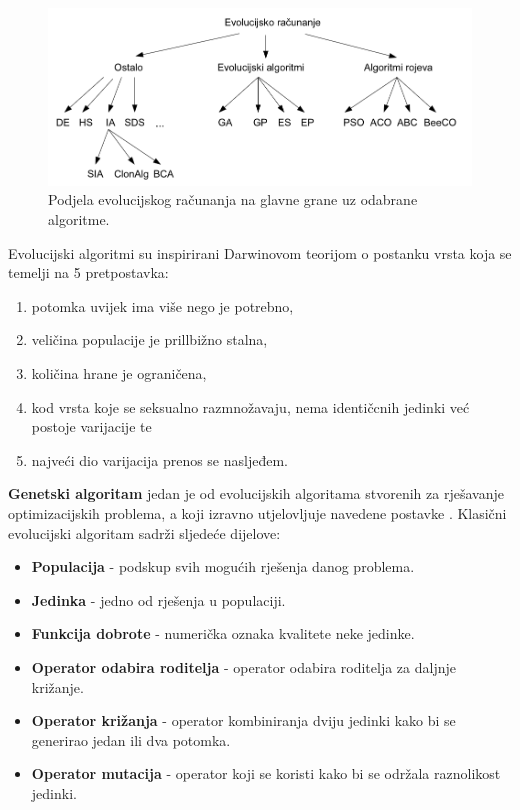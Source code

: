 \documentclass[times, utf8, zavrsni]{fer}
\begin{document}
\begin{figure}[htb]
\centering
\includegraphics[width=15cm]{images/evolucijske_grane.png}
\caption{Podjela evolucijskog računanja na glavne grane uz odabrane algoritme. \citep{cupic-disertacija}}
\label{fig:evolucijske_grane}
\end{figure}

Evolucijski algoritmi su inspirirani Darwinovom teorijom o postanku vrsta koja se temelji na 5 pretpostavka:

\begin{enumerate}
	\item potomka uvijek ima više nego je potrebno,
	\item veličina populacije je prillbižno stalna,
	\item količina hrane je ograničena,
	\item kod vrsta koje se seksualno razmnožavaju, nema identičcnih jedinki već postoje varijacije te
	\item najveći dio varijacija prenos se nasljeđem.
\end{enumerate}

	\textbf{Genetski algoritam} jedan je od evolucijskih algoritama stvorenih za rješavanje optimizacijskih problema, a koji izravno utjelovljuje navedene postavke \citep{cupic-skripta}.  Klasični evolucijski algoritam sadrži sljedeće dijelove:
	
\begin{itemize}
	\item \textbf{Populacija} - podskup svih mogućih rješenja danog problema.
	\item \textbf{Jedinka} - jedno od rješenja u populaciji.
	\item \textbf{Funkcija dobrote} - numerička oznaka kvalitete neke jedinke.
	\item \textbf{Operator odabira roditelja} - operator odabira roditelja za daljnje križanje.
	\item \textbf{Operator križanja} - operator kombiniranja dviju jedinki kako bi se generirao jedan ili dva potomka.
	\item \textbf{Operator mutacija} - operator koji se koristi kako bi se održala raznolikost jedinki.
\end{itemize}
\end{document}
